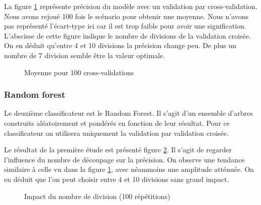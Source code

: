 \documentclass[11pt,a4paper]{article}
\begin{document}
			La figure \ref{cv_dt} représente précision du modèle avec un validation par cross-validation. Nous avons rejoué 100 fois le scénario pour obtenir une moyenne. Nous n'avons pas représenté l'écart-type ici car il est trop faible pour avoir une signification. L'abscisse de cette figure indique le nombre de divisions de la validation croisée.
			On en déduit qu'entre 4 et 10 divisions la précision change peu. De plus un nombre de 7 division semble être la valeur optimale.

			\begin{figure}
			\begin{center}
				\caption{Moyenne pour 100 cross-validations}
				\label{cv_dt}
			\end{center}
			\end{figure}


		\subsubsection{Random forest}
		
			Le deuxième classificateur est le Random Forest. Il s'agit d'un ensemble d'arbres construits aléatoirement et pondérés en fonction de leur résultat. Pour ce classificateur on utilisera uniquement la validation par validation croisée.

			Le résultat de la première étude est présenté figure \ref{random_forest}. Il s'agit de regarder l'influence du nombre de découpage sur la précision. On observe une tendance similaire à celle vu dans la figure \ref{cv_dt}, avec néammoins une amplitude atténuée. On en déduit que l'on peut choisir entre 4 et 10 divisions sans grand impact.


			\begin{figure}
			\begin{center}
				\caption{Impact du nombre de division (100 répétitions)}
				\label{random_forest}
			\end{center}
			\end{figure}
\end{document}
